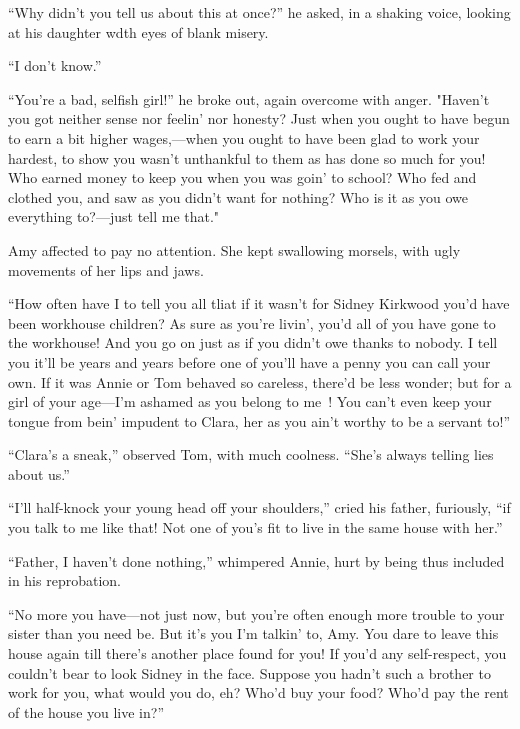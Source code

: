 ``Why didn't you tell us about this at once?'' he asked, in a shaking
voice, looking at his daughter wdth eyes of blank misery.

``I don't know.''

``You're a bad, selfish girl!'' he broke out, again overcome with anger.
"Haven't you got neither sense nor feelin' nor honesty? Just when you
ought to have begun to earn a bit higher wages,---when you ought to have
been glad to work your hardest, to show you wasn't unthankful to them as
has done so much for you! Who earned money to keep you when you was
goin' to school? Who fed and clothed you, and saw as you didn't want
{\protect\hypertarget{260}{}{}} for nothing? Who is it as you owe
everything to?---just tell me that."

Amy affected to pay no attention. She kept swallowing morsels, with ugly
movements of her lips and jaws.

``How often have I to tell you all tliat if it wasn't for Sidney
Kirkwood you'd have been workhouse children? As sure as you're livin',
you'd all of you have gone to the workhouse! And you go on just as if
you didn't owe thanks to nobody. I tell you it'll be years and years
before one of you'll have a penny you can call your own. If it was Annie
or Tom behaved so careless, there'd be less wonder; but for a girl of
your age---I'm ashamed as you belong to me~! You can't even keep your
tongue from bein' impudent to Clara, her as you ain't worthy to be a
servant to!''

``Clara's a sneak,'' observed Tom, with much coolness. ``She's always
telling lies about us.''

``I'll half-knock your young head off your shoulders,'' cried his
father, furiously, ``if you talk to me like that! Not one of you's fit
to live in the same house with her.''

``Father, I haven't done nothing,'' whimpered
{\protect\hypertarget{261}{}{}} Annie, hurt by being thus included in
his reprobation.

``No more you have---not just now, but you're often enough more trouble
to your sister than you need be. But it's you I'm talkin' to, Amy. You
dare to leave this house again till there's another place found for you!
If you'd any self-respect, you couldn't bear to look Sidney in the face.
Suppose you hadn't such a brother to work for you, what would you do,
eh? Who'd buy your food? Who'd pay the rent of the house you live in?''

